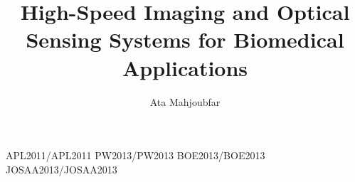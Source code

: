 \documentclass [PhD] {uclathes}
\title          {High-Speed Imaging and Optical Sensing Systems for Biomedical Applications}
\author         {Ata Mahjoubfar}
\begin{document}
\makeintropages

%
%
 {APL2011/APL2011}                         %
 {PW2013/PW2013}                         %
 {BOE2013/BOE2013}
 {JOSAA2013/JOSAA2013}





\end{document}
